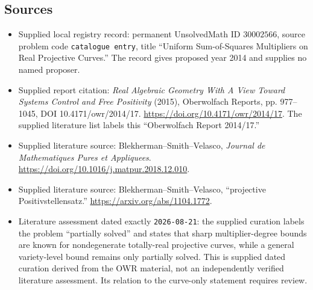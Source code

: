 \documentclass[11pt]{article}
\begin{document}
\subsection{Sources}
\begin{itemize}
\item Supplied local registry record: permanent UnsolvedMath ID \(30002566\), source problem code \texttt{catalogue entry}, title ``Uniform Sum-of-Squares Multipliers on Real Projective Curves.'' The record gives proposed year 2014 and supplies no named proposer.
\item Supplied report citation: \emph{Real Algebraic Geometry With A View Toward Systems Control and Free Positivity} (2015), Oberwolfach Reports, pp. 977--1045, DOI 10.4171/owr/2014/17. \url{https://doi.org/10.4171/owr/2014/17}. The supplied literature list labels this ``Oberwolfach Report 2014/17.''
\item Supplied literature source: Blekherman--Smith--Velasco, \emph{Journal de Mathematiques Pures et Appliquees}. \url{https://doi.org/10.1016/j.matpur.2018.12.010}.
\item Supplied literature source: Blekherman--Smith--Velasco, ``projective Positivstellensatz.'' \url{https://arxiv.org/abs/1104.1772}.
\item Literature assessment dated exactly \texttt{2026-08-21}: the supplied curation labels the problem ``partially solved'' and states that sharp multiplier-degree bounds are known for nondegenerate totally-real projective curves, while a general variety-level bound remains only partially solved. This is supplied dated curation derived from the OWR material, not an independently verified literature assessment. Its relation to the curve-only statement requires review.
\end{itemize}
\end{document}
